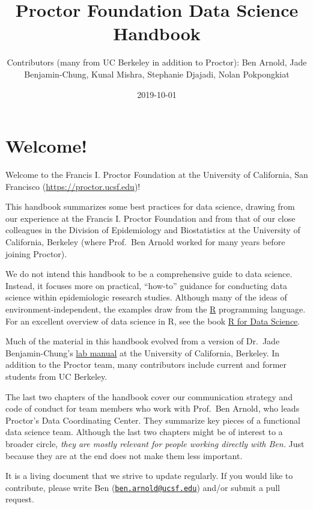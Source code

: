 \documentclass[]{book}
\title{Proctor Foundation Data Science Handbook}
\author{Contributors (many from UC Berkeley in addition to Proctor): Ben Arnold, Jade Benjamin-Chung, Kunal Mishra, Stephanie Djajadi, Nolan Pokpongkiat}
\date{2019-10-01}
\begin{document}
\maketitle

{
\setcounter{tocdepth}{1}
\tableofcontents
}
\hypertarget{welcome}{%
\chapter*{Welcome!}\label{welcome}}

Welcome to the Francis I. Proctor Foundation at the University of California, San Francisco (\url{https://proctor.ucsf.edu})!

This handbook summarizes some best practices for data science, drawing from our experience at the Francis I. Proctor Foundation and from that of our close colleagues in the Division of Epidemiology and Biostatistics at the University of California, Berkeley (where Prof.~Ben Arnold worked for many years before joining Proctor).

We do not intend this handbook to be a comprehensive guide to data science. Instead, it focuses more on practical, ``how-to'' guidance for conducting data science within epidemiologic research studies. Although many of the ideas of environment-independent, the examples draw from the \href{https://cran.r-project.org/}{R} programming language. For an excellent overview of data science in R, see the book \href{https://r4ds.had.co.nz/}{R for Data Science}.

Much of the material in this handbook evolved from a version of Dr.~Jade Benjamin-Chung's \href{https://github.com/jadebc-berkeley/lab-manual}{lab manual} at the University of California, Berkeley. In addition to the Proctor team, many contributors include current and former students from UC Berkeley.

The last two chapters of the handbook cover our communication strategy and code of conduct for team members who work with Prof.~Ben Arnold, who leads Proctor's Data Coordinating Center. They summarize key pieces of a functional data science team. Although the last two chapters might be of interest to a broader circle, \emph{they are mostly relevant for people working directly with Ben.} Just because they are at the end does not make them less important.

It is a living document that we strive to update regularly. If you would like to contribute, please write Ben (\href{mailto:ben.arnold@ucsf.edu}{\nolinkurl{ben.arnold@ucsf.edu}}) and/or submit a pull request.
\end{document}
